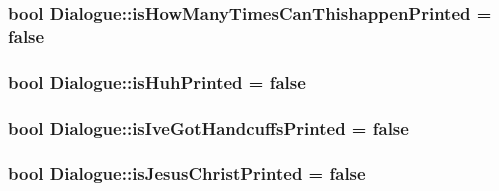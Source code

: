 \subsubsection[{\texorpdfstring{is\+How\+Many\+Times\+Can\+Thishappen\+Printed}{isHowManyTimesCanThishappenPrinted}}]{\setlength{\rightskip}{0pt plus 5cm}bool Dialogue\+::is\+How\+Many\+Times\+Can\+Thishappen\+Printed = false\hspace{0.3cm}{\ttfamily [protected]}}\hypertarget{classDialogue_a24253923b1e9e6f70e5be528a7550c5f}{}\label{classDialogue_a24253923b1e9e6f70e5be528a7550c5f}
\subsubsection[{\texorpdfstring{is\+Huh\+Printed}{isHuhPrinted}}]{\setlength{\rightskip}{0pt plus 5cm}bool Dialogue\+::is\+Huh\+Printed = false\hspace{0.3cm}{\ttfamily [protected]}}\hypertarget{classDialogue_afc51238031a3b5e1cf32e008d11c03c8}{}\label{classDialogue_afc51238031a3b5e1cf32e008d11c03c8}
\subsubsection[{\texorpdfstring{is\+Ive\+Got\+Handcuffs\+Printed}{isIveGotHandcuffsPrinted}}]{\setlength{\rightskip}{0pt plus 5cm}bool Dialogue\+::is\+Ive\+Got\+Handcuffs\+Printed = false\hspace{0.3cm}{\ttfamily [protected]}}\hypertarget{classDialogue_af57c1594003386937920fc9287589bc1}{}\label{classDialogue_af57c1594003386937920fc9287589bc1}
\subsubsection[{\texorpdfstring{is\+Jesus\+Christ\+Printed}{isJesusChristPrinted}}]{\setlength{\rightskip}{0pt plus 5cm}bool Dialogue\+::is\+Jesus\+Christ\+Printed = false\hspace{0.3cm}{\ttfamily [protected]}}\hypertarget{classDialogue_a54544b789f4b8a06542f20c37ce6b2e0}{}\label{classDialogue_a54544b789f4b8a06542f20c37ce6b2e0}
